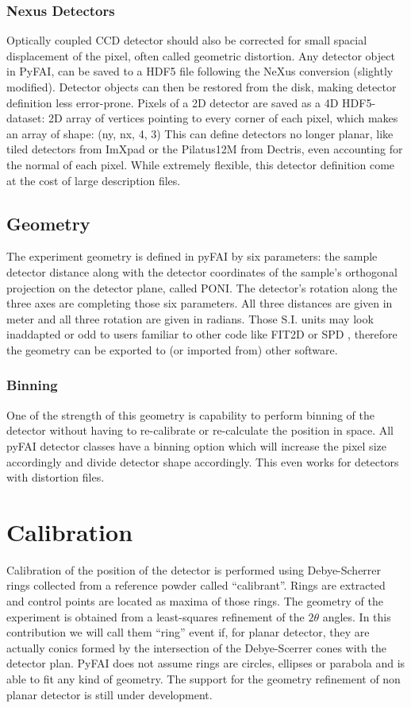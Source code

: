 \documentclass[preprint]{iucr}
\begin{document}
\subsubsection{Nexus Detectors}
Optically coupled CCD detector should also be corrected
for small spacial displacement of the pixel, often called geometric distortion.
Any detector object in PyFAI, can be saved to a HDF5 file following the NeXus
conversion (slightly modified).
Detector objects can then be restored from the disk, making detector definition
less error-prone.
Pixels of a 2D detector are saved as a 4D HDF5-dataset: 2D array of vertices
pointing to every corner of each pixel, which makes an array of shape: (ny, nx, 4, 3)
This can define detectors no longer planar, like tiled detectors from
ImXpad or the Pilatus12M from Dectris, even accounting for the normal of each
pixel. 
While extremely flexible, this detector definition come at the cost of
large description files.

\subsection{Geometry}
The experiment geometry is defined in pyFAI by six parameters: the sample
detector distance along with the detector coordinates of the sample's orthogonal
projection on the detector plane, called PONI. 
The detector's rotation along the three axes are completing those six
parameters. 
All three distances are given in meter and all three rotation are given
in radians.
Those S.I. units may look inaddapted or odd to users familiar to other code
like FIT2D \cite{fit2d} or SPD \cite{spd}, therefore the geometry can be
exported to (or imported from) other software.

 
\subsubsection{Binning}
One of the strength of this geometry is capability to perform binning of the
detector without having to re-calibrate or re-calculate the position in space.
All pyFAI detector classes have a binning option which will increase the pixel
size accordingly and divide detector shape accordingly. 
This even works for detectors with distortion files. 

\section{Calibration}
Calibration of the position of the detector is performed using Debye-Scherrer
rings collected from a reference powder called ``calibrant''.
Rings are extracted and control points are located as maxima of those rings.
The geometry of the experiment is obtained from a least-squares refinement of
the $2\theta$ angles.
In this contribution we will call them ``ring'' event if, for planar detector,
they are actually conics formed by the intersection of the Debye-Scerrer cones
with the detector plan. 
PyFAI does not assume rings are circles, ellipses or parabola and is able to fit
any kind of geometry. The support for the geometry refinement of non planar
detector is still under development.
\end{document}
